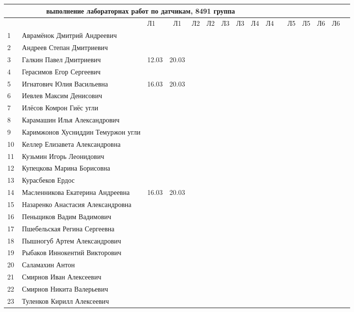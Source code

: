 \documentclass[a4paper,landscape,11pt]{article}
\begin{document}
\newpage
%
\begin{tabular}{l|llccccccccccccc}
\multicolumn{10}{c}{выполнение лабораторнах работ по датчикам, 8491 группа} \\
\toprule
&&Л1&Л1& Л2&Л2& Л3&Л3& Л4&Л4& &Л5&Л5& Л6&Л6\\
\midrule
1\,&   Аврамёнок Дмитрий Андреевич        &&&&&&&&\\
2\,&   Андреев Степан Дмитриевич          &&&&&&&&\\
3\,&   Галкин Павел Дмитриевич            & 12.03& 20.03&&&&&&\\
4\,&   Герасимов Егор Сергеевич           &&&&&&&&\\
5\,&   Игнатович Юлия Васильевна          & 16.03& 20.03&&&&&&\\
\midrule
6\,&   Иевлев Максим Денисович            &&&&&&&&\\
7\,&   Илёсов Комрон Гиёс угли            &&&&&&&&\\
8\,&   Карамашин Илья Александрович       &&&&&&&&\\
9\,&   Каримжонов Хусниддин Темуржон угли &&&&&&&&\\
10\,&  Келлер Елизавета Александровна     &&&&&&&&\\
\midrule
11\,&  Кузьмин Игорь Леонидович           &&&&&&&&\\
12\,&  Купецкова Марина Борисовна         &&&&&&&&\\
13\,&  Курасбеков Ердос                   &&&&&&&&\\
14\,&  Масленникова Екатерина Андреевна   & 16.03& 20.03&&&&&&\\
15\,&  Назаренко Анастасия Александровна  &&&&&&&&\\
\midrule
16\,&  Пеньщиков Вадим Вадимович          &&&&&&&&\\
17\,&  Пшебельская Регина Сергеевна       &&&&&&&&\\
18\,&  Пышногуб Артем Александрович       &&&&&&&&\\
19\,&  Рыбаков Иннокентий Викторович      &&&&&&&&\\
20\,&  Саламахин Антон                    &&&&&&&&\\
\midrule
21\,&  Смирнов Иван Алексеевич            &&&&&&&&\\
22\,&  Смирнов Никита Валерьевич          &&&&&&&&\\
23\,&  Туленков Кирилл Алексеевич         &&&&&&&&\\
\bottomrule
\end{tabular}
\end{document}
